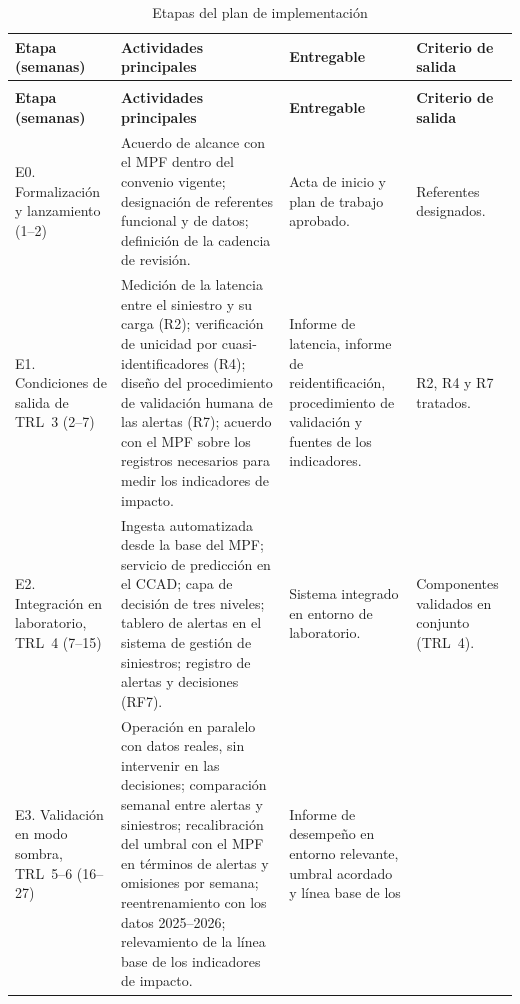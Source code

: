 {\small
\begin{longtable}{@{}>{\raggedright\arraybackslash}p{}
                    >{\raggedright\arraybackslash}p{}
                    >{\raggedright\arraybackslash}p{}
                    >{\raggedright\arraybackslash}p{}@{}}
\caption{Etapas del plan de implementación}
\label{tab:impl-etapas} \\
\toprule
\textbf{Etapa (semanas)} & \textbf{Actividades principales} & \textbf{Entregable} & \textbf{Criterio de salida} \\
\midrule
\endfirsthead
\multicolumn{4}{@{}l}{\footnotesize\textit{Tabla \ref{tab:impl-etapas} (continuación)}} \\
\toprule
\textbf{Etapa (semanas)} & \textbf{Actividades principales} & \textbf{Entregable} & \textbf{Criterio de salida} \\
\midrule
\endhead
\bottomrule
\endfoot
E0. Formalización y lanzamiento (1--2)
  & Acuerdo de alcance con el MPF dentro del convenio vigente; designación de
    referentes funcional y de datos; definición de la cadencia de revisión.
  & Acta de inicio y plan de trabajo aprobado.
  & Referentes designados. \\
E1. Condiciones de salida de TRL~3 (2--7)
  & Medición de la latencia entre el siniestro y su carga (R2); verificación de
    unicidad por cuasi-identificadores (R4); diseño del procedimiento de validación
    humana de las alertas (R7); acuerdo con el MPF sobre los registros necesarios para
    medir los indicadores de impacto.
  & Informe de latencia, informe de reidentificación, procedimiento de validación y
    fuentes de los indicadores.
  & R2, R4 y R7 tratados. \\
E2. Integración en laboratorio, TRL~4 (7--15)
  & Ingesta automatizada desde la base del MPF; servicio de predicción en el CCAD;
    capa de decisión de tres niveles; tablero de alertas en el sistema de gestión de
    siniestros; registro de alertas y decisiones (RF7).
  & Sistema integrado en entorno de laboratorio.
  & Componentes validados en conjunto (TRL~4). \\
E3. Validación en modo sombra, TRL~5--6 (16--27)
  & Operación en paralelo con datos reales, sin intervenir en las decisiones;
    comparación semanal entre alertas y siniestros; recalibración del umbral con el
    MPF en términos de alertas y omisiones por semana; reentrenamiento con los datos
    2025--2026; relevamiento de la línea base de los indicadores de impacto.
  & Informe de desempeño en entorno relevante, umbral acordado y línea base de los

\end{longtable}}
